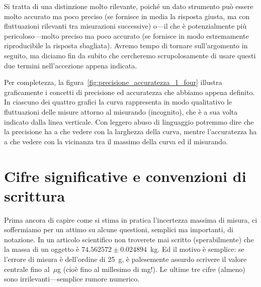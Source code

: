 Si tratta di una distinzione molto rilevante, poiché un dato strumento può
essere molto accurato ma poco preciso (se fornisce in media la risposta giusta,
ma con fluttuazioni rilevanti tra misurazioni successive) o---il che è
potenzialmente più pericoloso---molto preciso ma poco accurato (se fornisce
in modo estremamente riproducibile la risposta sbagliata). Avremo tempo di
tornare sull'argomento in seguito, ma diciamo fin da subito che cercheremo
scrupolosamente di usare questi due termini nell'accezione appena indicata.


Per completezza, la figura~\ref{fig:precisione_accuratezza_1_four} illustra
graficamente i concetti di precisione ed accuratezza che abbiamo appena
definito. In ciascuno dei quattro grafici la curva rappresenta in modo
qualitativo le fluttuazioni delle misure attorno al misurando (incognito), che
è a sua volta indicato dalla linea verticale. Con leggero abuso di
linguaggio potremmo dire che la precisione ha a che vedere con la larghezza
della curva, mentre l'accuratezza ha a che vedere con la vicinanza tra il
massimo della curva ed il misurando.


\section{Cifre significative e convenzioni di scrittura}
\label{sec:cifre_significative}

Prima ancora di capire come si stima in pratica l'incertezza massima di misura,
ci soffermiamo per un attimo su alcune questioni, semplici ma importanti, di
notazione. In un articolo scientifico non troverete mai scritto (sperabilmente)
che la massa di un oggetto è $74.562572 \pm 0.024894$~kg. Ed il motivo è
semplice: se l'errore di misura è dell'ordine di 25~g, è palesemente
assurdo scrivere il valore centrale fino al~$\mu$g (cioè fino al millesimo di
mg!). Le ultime tre cifre (almeno) sono irrilevanti---semplice rumore numerico.

